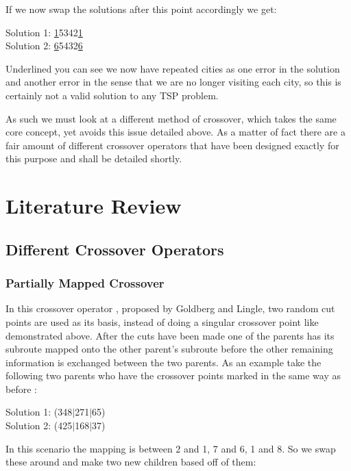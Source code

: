 \documentclass[11pt,a4paper,titlepage]{article}
\begin{document}
If we now swap the solutions after this point accordingly we get:

\begin{center}\Large
Solution 1: \underline{1}5342\underline{1}\\
Solution 2: \underline{6}5432\underline{6}
\end{center}

Underlined you can see we now have repeated cities as one error in the solution and another error in the sense that we are no longer visiting each city, so this is certainly not a valid solution to any TSP problem.

As such we must look at a different method of crossover, which takes the same core concept, yet avoids this issue detailed above. As a matter of fact there are a fair amount of different crossover operators that have been designed exactly for this purpose and shall be detailed shortly.

\section{Literature Review}

\subsection{Different Crossover Operators}

\subsubsection{Partially Mapped Crossover}

In this crossover operator \cite{GACrossover}, proposed by Goldberg and Lingle, two random cut points are used as its basis, instead of doing a singular crossover point like demonstrated above. After the cuts have been made one of the parents has its subroute mapped onto the other parent's subroute before the other remaining information is exchanged between the two parents. As an example take the following two parents who have the crossover points marked in the same way as before \cite{GACrossover}:

\begin{center}\Large
Solution 1: (348$|$271$|$65)\\
Solution 2: (425$|$168$|$37)
\end{center}

In this scenario the mapping is between 2 and 1, 7 and 6, 1 and 8. So we swap these around and make two new children based off of them:
\end{document}
